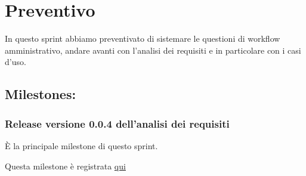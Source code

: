 \section{Preventivo}

In questo sprint abbiamo preventivato di sistemare le questioni di workflow amministrativo, andare avanti con l'analisi dei requisiti e in particolare con i casi d'uso.

\subsection{Milestones:}  
\subsubsection{Release versione 0.0.4 dell'analisi dei requisiti}

È la principale milestone di questo sprint.

Questa milestone è registrata \href{https://github.com/SWEasabi/analisi-dei-requisiti/milestone/4}{qui}
